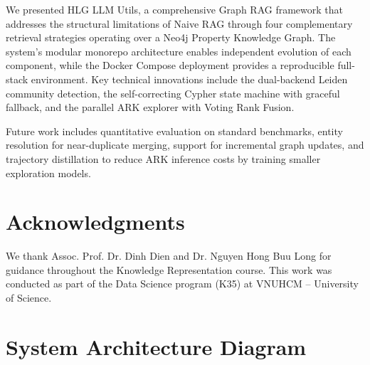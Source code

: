 \documentclass[11pt]{article}
\begin{document}
We presented HLG LLM Utils, a comprehensive Graph RAG framework that addresses the structural limitations of Naive RAG through four complementary retrieval strategies operating over a Neo4j Property Knowledge Graph. The system's modular monorepo architecture enables independent evolution of each component, while the Docker Compose deployment provides a reproducible full-stack environment. Key technical innovations include the dual-backend Leiden community detection, the self-correcting Cypher state machine with graceful fallback, and the parallel ARK explorer with Voting Rank Fusion.

Future work includes quantitative evaluation on standard benchmarks, entity resolution for near-duplicate merging, support for incremental graph updates, and trajectory distillation \citep{polonuer2026ark} to reduce ARK inference costs by training smaller exploration models.

\section*{Acknowledgments}

We thank Assoc. Prof. Dr. Dinh Dien and Dr. Nguyen Hong Buu Long for guidance throughout the Knowledge Representation course. This work was conducted as part of the Data Science program (K35) at VNUHCM -- University of Science.



\appendix

\section{System Architecture Diagram}
\label{sec:arch}
\end{document}
